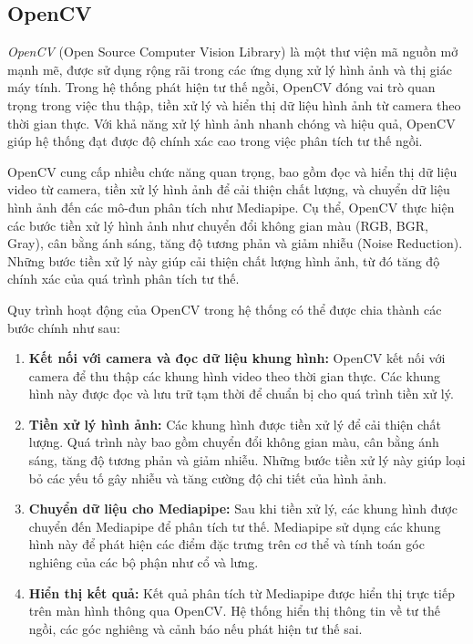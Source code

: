 \documentclass[conference]{IEEEtran}
\begin{document}
\subsection{OpenCV}
\textit{OpenCV} (Open Source Computer Vision Library) là một thư viện mã nguồn mở mạnh mẽ, được sử dụng rộng rãi trong các ứng dụng xử lý hình ảnh và thị giác máy tính. Trong hệ thống phát hiện tư thế ngồi, OpenCV đóng vai trò quan trọng trong việc thu thập, tiền xử lý và hiển thị dữ liệu hình ảnh từ camera theo thời gian thực. Với khả năng xử lý hình ảnh nhanh chóng và hiệu quả, OpenCV giúp hệ thống đạt được độ chính xác cao trong việc phân tích tư thế ngồi.

OpenCV cung cấp nhiều chức năng quan trọng, bao gồm đọc và hiển thị dữ liệu video từ camera, tiền xử lý hình ảnh để cải thiện chất lượng, và chuyển dữ liệu hình ảnh đến các mô-đun phân tích như Mediapipe. Cụ thể, OpenCV thực hiện các bước tiền xử lý hình ảnh như chuyển đổi không gian màu (RGB, BGR, Gray), cân bằng ánh sáng, tăng độ tương phản và giảm nhiễu (Noise Reduction). Những bước tiền xử lý này giúp cải thiện chất lượng hình ảnh, từ đó tăng độ chính xác của quá trình phân tích tư thế.

Quy trình hoạt động của OpenCV trong hệ thống có thể được chia thành các bước chính như sau:

\begin{enumerate}
    \item \textbf{Kết nối với camera và đọc dữ liệu khung hình:} OpenCV kết nối với camera để thu thập các khung hình video theo thời gian thực. Các khung hình này được đọc và lưu trữ tạm thời để chuẩn bị cho quá trình tiền xử lý.
    \item \textbf{Tiền xử lý hình ảnh:} Các khung hình được tiền xử lý để cải thiện chất lượng. Quá trình này bao gồm chuyển đổi không gian màu, cân bằng ánh sáng, tăng độ tương phản và giảm nhiễu. Những bước tiền xử lý này giúp loại bỏ các yếu tố gây nhiễu và tăng cường độ chi tiết của hình ảnh.
    \item \textbf{Chuyển dữ liệu cho Mediapipe:} Sau khi tiền xử lý, các khung hình được chuyển đến Mediapipe để phân tích tư thế. Mediapipe sử dụng các khung hình này để phát hiện các điểm đặc trưng trên cơ thể và tính toán góc nghiêng của các bộ phận như cổ và lưng.
    \item \textbf{Hiển thị kết quả:} Kết quả phân tích từ Mediapipe được hiển thị trực tiếp trên màn hình thông qua OpenCV. Hệ thống hiển thị thông tin về tư thế ngồi, các góc nghiêng và cảnh báo nếu phát hiện tư thế sai.
\end{enumerate}
\end{document}
